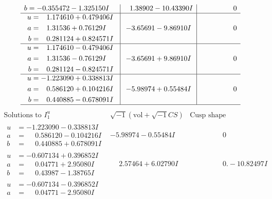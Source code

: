 \documentclass[1p]{elsarticle_modified}
\theoremstyle{definition}
\newcommand{\I}{\sqrt{-1}}
\begin{document}
$$\begin{array}{c|c|c}
\begin{aligned}
b &= -0.355472 - 1.325150 I\end{aligned}
 & \phantom{-}1.38902 - 10.43390 I & \phantom{-0.000000 } 0 \\ \hline\begin{aligned}
u &= \phantom{-}1.174610 + 0.479406 I \\
a &= \phantom{-}1.31536 + 0.76129 I \\
b &= \phantom{-}0.281124 + 0.824571 I\end{aligned}
 & -3.65691 - 9.86910 I & \phantom{-0.000000 } 0 \\ \hline\begin{aligned}
u &= \phantom{-}1.174610 - 0.479406 I \\
a &= \phantom{-}1.31536 - 0.76129 I \\
b &= \phantom{-}0.281124 - 0.824571 I\end{aligned}
 & -3.65691 + 9.86910 I & \phantom{-0.000000 } 0 \\ \hline\begin{aligned}
u &= -1.223090 + 0.338813 I \\
a &= \phantom{-}0.586120 + 0.104216 I \\
b &= \phantom{-}0.440885 - 0.678091 I\end{aligned}
 & -5.98974 + 0.55484 I & \phantom{-0.000000 } 0\\
 \hline 
 \end{array}$$\newpage$$\begin{array}{c|c|c}  
\text{Solutions to }I^u_{1}& \I (\text{vol} + \sqrt{-1}CS) & \text{Cusp shape}\\
 \hline 
\begin{aligned}
u &= -1.223090 - 0.338813 I \\
a &= \phantom{-}0.586120 - 0.104216 I \\
b &= \phantom{-}0.440885 + 0.678091 I\end{aligned}
 & -5.98974 - 0.55484 I & \phantom{-0.000000 } 0 \\ \hline\begin{aligned}
u &= -0.607134 + 0.396852 I \\
a &= \phantom{-}0.04771 + 2.95080 I \\
b &= \phantom{-}0.43987 - 1.38765 I\end{aligned}
 & \phantom{-}2.57464 + 6.02790 I & \phantom{-0.000000 } 0. - 10.82497 I \\ \hline\begin{aligned}
u &= -0.607134 - 0.396852 I \\
a &= \phantom{-}0.04771 - 2.95080 I \\

\end{aligned}
\end{array}$$
\end{document}
